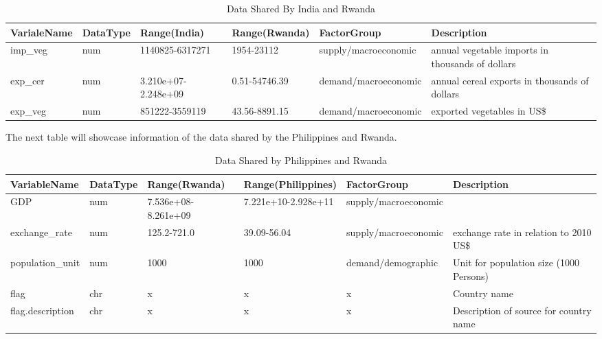 \documentclass[11pt]{article}
\begin{document}
\begin{table}[!htbp]
\centering
\begin{adjustbox}{max width=\textwidth}
\begin{tabular}{llllll}
\hline
VarialeName & DataType & Range(India)        & Range(Rwanda) & FactorGroup          & Description                                      \\ \hline
imp\_veg    & num      & 1140825-6317271     & 1954-23112    & supply/macroeconomic & annual vegetable imports in thousands of dollars \\
exp\_cer    & num      & 3.210e+07-2.248e+09 & 0.51-54746.39 & demand/macroeconomic & annual cereal exports in thousands of dollars    \\
exp\_veg    & num      & 851222-3559119      & 43.56-8891.15 & demand/macroeconomic & exported vegetables in US\$    \\        \hline         
\end{tabular}
\end{adjustbox}
\caption{Data Shared By India and Rwanda}
\label{table2}
\end{table}
\FloatBarrier

The next table will showcase information of the data shared by the Philippines and Rwanda.

\FloatBarrier
\begin{table}[!htbp]
\large
\centering
\begin{adjustbox}{max width=\textwidth}
\begin{tabular}{llllll}
\hline
VariableName     & DataType & Range(Rwanda)       & Range(Philippines)  & FactorGroup          & Description                             \\ \hline
GDP              & num      & 7.536e+08-8.261e+09 & 7.221e+10-2.928e+11 & supply/macroeconomic &                                         \\
exchange\_rate   & num      & 125.2-721.0         & 39.09-56.04         & supply/macroeconomic & exchange rate in relation to 2010 US\$  \\
population\_unit & num      & 1000                & 1000                & demand/demographic   & Unit for population size (1000 Persons) \\
flag             & chr      & x                   & x                   & x                    & Country name                            \\
flag.description & chr      & x                   & x                   & x                    & Description of source for country name \\ \hline
\end{tabular}
\end{adjustbox}
\caption{Data Shared by Philippines and Rwanda }
\label{table3l}
\end{table}
\FloatBarrier
\end{document}

